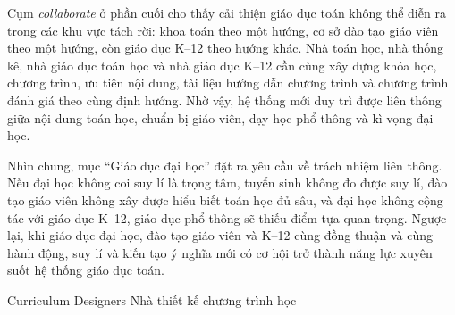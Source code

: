 {{    Cụm \emph{collaborate} ở phần cuối cho thấy cải thiện giáo dục toán không thể diễn ra trong các khu vực tách rời: khoa toán theo một hướng, cơ sở đào tạo giáo viên theo một hướng, còn giáo dục K--12 theo hướng khác. Nhà toán học, nhà thống kê, nhà giáo dục toán học và nhà giáo dục K--12 cần cùng xây dựng khóa học, chương trình, ưu tiên nội dung, tài liệu hướng dẫn chương trình và chương trình đánh giá theo cùng định hướng. Nhờ vậy, hệ thống mới duy trì được liên thông giữa nội dung toán học, chuẩn bị giáo viên, dạy học phổ thông và kì vọng đại học.

    Nhìn chung, mục ``Giáo dục đại học'' đặt ra yêu cầu về trách nhiệm liên thông. Nếu đại học không coi suy lí là trọng tâm, tuyển sinh không đo được suy lí, đào tạo giáo viên không xây được hiểu biết toán học đủ sâu, và đại học không cộng tác với giáo dục K--12, giáo dục phổ thông sẽ thiếu điểm tựa quan trọng. Ngược lại, khi giáo dục đại học, đào tạo giáo viên và K--12 cùng đồng thuận và cùng hành động, suy lí và kiến tạo ý nghĩa mới có cơ hội trở thành năng lực xuyên suốt hệ thống giáo dục toán.}
  }

\ParallelSection
  {Curriculum Designers}
  {Nhà thiết kế chương trình học}
  {}

